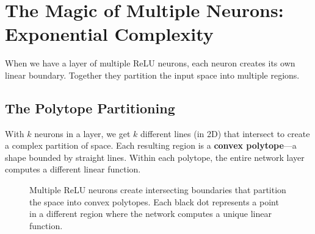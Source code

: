 \documentclass[11pt]{article}
\newcommand{\x}{\mathbf{x}}
\newcommand{\y}{\mathbf{y}}
\begin{document}
\section{The Magic of Multiple Neurons: Exponential Complexity}
When we have a layer of multiple ReLU neurons, each neuron creates its own linear boundary. Together they partition the input space into multiple regions.

\subsection{The Polytope Partitioning}
With $k$ neurons in a layer, we get $k$ different lines (in 2D) that intersect to create a complex partition of space. Each resulting region is a \textbf{convex polytope}—a shape bounded by straight lines. Within each polytope, the entire network layer computes a different linear function.

\begin{figure}[h!]
\centering
{}
\caption{Multiple ReLU neurons create intersecting boundaries that partition the space into convex polytopes. Each black dot represents a point in a different region where the network computes a unique linear function.}
\label{fig:multiple_neurons}
\end{figure}
\end{document}
